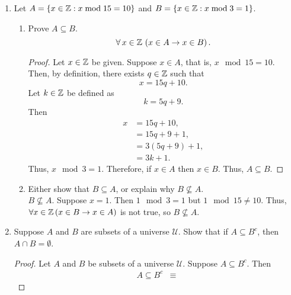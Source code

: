 \documentclass[a4paper, 12pt]{../../config/homework}
\begin{document}
\begin{enumerate}
\pagebreak
\item Let $A=\left\{ x\in\mathbb{Z} : x\;\text{mod}\; 15 = 10\right\}$ and $B=\left\{ x\in\mathbb{Z} : x\;\text{mod}\; 3 =1 \right\}$.
\begin{enumerate}[label=(\alph*)]
\item Prove $A \subseteq B$.
\[\forall\,x \in \mathbb{Z}\,\left(x\in A \rightarrow x\in B\right).\]
\begin{proof}
Let $x\in\mathbb{Z}$ be given. Suppose $x\in A$, that is, $x\mod15=10$. Then, by definition, there exists $q\in\mathbb{Z}$ such that
\[x = 15q + 10.\]
Let $k\in\mathbb{Z}$ be defined as
\[k = 5q + 9.\]
Then
\begin{align*}
x &= 15q + 10,
\\&= 15q + 9 + 1,
\\&= 3(5q + 9) + 1,
\\&= 3k + 1.
\end{align*}
Thus, $x\mod3 = 1$. Therefore, if $x\in A$ then $x\in B$. Thus, $A \subseteq B$.
\end{proof}
\item Either show that $B\subseteq A$, or explain why $B \nsubseteq A$.
\\$B\nsubseteq A$. Suppose $x = 1$. Then $1\mod3 = 1$ but $1\mod15\neq 10$. Thus, $\forall x \in \mathbb{Z}\, (x\in B \rightarrow x \in A)$ is not true, so $B \nsubseteq A$.
\end{enumerate}

\pagebreak
\item Suppose $A$ and $B$ are subsets of a universe $\mathcal{U}$. Show that if $A\subseteq B^c$, then $A\cap B = \emptyset$.
\begin{proof}
Let $A$ and $B$ be subsets of a universe $\mathcal{U}$. Suppose $A\subseteq B^c$. Then
\begin{align*}
A \subseteq B^c &\equiv 
\end{align*}
\end{proof}

\end{enumerate}
\end{document}
